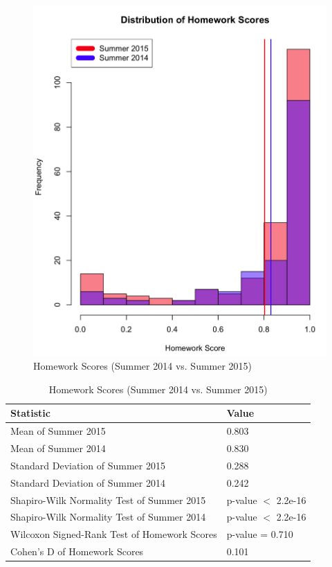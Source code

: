 \begin{figure}
	\centering
	\includegraphics[width=5in]{img/chapter4/hw_su15_vs_su14}
	\caption[Homework Scores (Summer 2014 vs. Summer 2015)]{Homework Scores (Summer 2014 vs. Summer 2015)}
  \label{fig:hwSu14Su15}
\end{figure}

\begin{small}
\begin{table}
  \centering
  \begin{tabular}{|l|l|}
    \hline
    \textbf{Statistic} & \textbf{Value} \\
	\hline
	Mean of Summer 2015 & 0.803 \\
	\hline
	Mean of Summer 2014 & 0.830 \\
	\hline
	Standard Deviation of Summer 2015 & 0.288 \\
	\hline
	Standard Deviation of Summer 2014 & 0.242 \\
	\hline
	Shapiro-Wilk Normality Test of Summer 2015 & p-value $<$ 2.2e-16 \\
	\hline
	Shapiro-Wilk Normality Test of Summer 2014 & p-value $<$ 2.2e-16 \\
	\hline
	Wilcoxon Signed-Rank Test of Homework Scores & p-value = 0.710 \\
	\hline
	Cohen's D of Homework Scores & 0.101 \\
	\hline
  \end{tabular}
	\caption[Homework Scores (Summer 2014 vs. Summer 2015)]{Homework Scores (Summer 2014 vs. Summer 2015)}
  \label{tab:hwSu14Su15}
\end{table}
\end{small}


